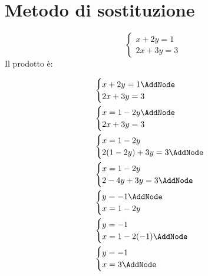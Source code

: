 \section{Metodo di sostituzione}
\label{sec:metosdosostituzione}
\label{cha:SistemiLineari}
\tcbstartrecording
\begin{exercise}
\[\begin{cases}
	x+2y=1\\
	2x+3y=3
\end{cases}
\]
	\tcblower
	Il prodotto è:
\begin{NodesList}
	\begin{align*}
	&\begin{cases}
	x+2y=1\AddNode\\
	2x+3y=3
	\end{cases}\\
	&\begin{cases}
	x=1-2y\AddNode\\
	2x+3y=3
	\end{cases}\\
	&\begin{cases}
	x=1-2y\\
	2(1-2y)+3y=3\AddNode\\
	\end{cases}\\
	&\begin{cases}
	x=1-2y\\
	2-4y+3y=3\AddNode\\
	\end{cases}\\
	&\begin{cases}
	y=-1\AddNode\\
	x=1-2y\\
	\end{cases}\\
	&\begin{cases}
	y=-1\\
	x=1-2(-1) \AddNode\\
	\end{cases}\\
	&\begin{cases}
	y=-1\\
	x=3 \AddNode\\
	\end{cases}\\
	\end{align*}
		\LinkNodes[margin=4 cm]{\begin{minipage}{2cm}

\end{minipage}}
\end{NodesList}
\end{exercise}
